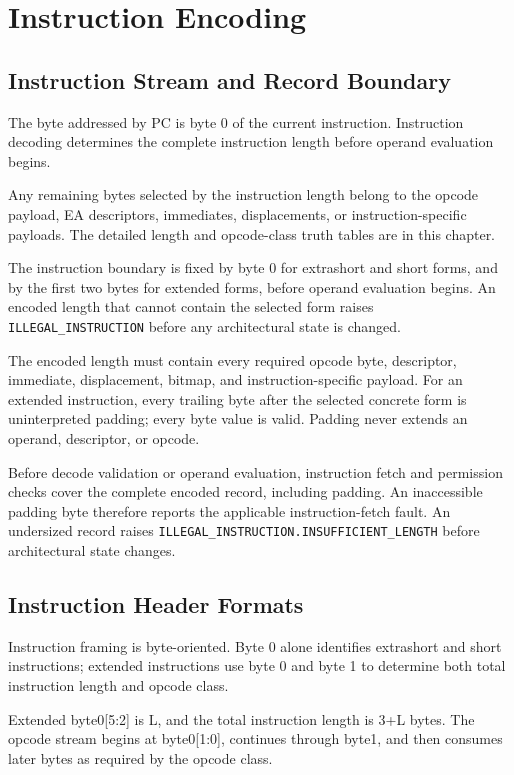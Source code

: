 \clearpage
\section{Instruction Encoding}\label{page:instruction-encoding}\label{section:instruction-header-formats}

\subsection{Instruction Stream and Record Boundary}
The byte addressed by PC is byte 0 of the current instruction. Instruction decoding determines the complete
instruction length before operand evaluation begins.

Any remaining bytes selected by the instruction length belong to the opcode payload, EA descriptors, immediates,
displacements, or instruction-specific payloads. The detailed length and opcode-class truth tables are in this
chapter.

The instruction boundary is fixed by byte 0 for extrashort and short forms, and by the first two bytes for
extended forms, before operand evaluation begins. An encoded length that cannot contain the selected form raises
\texttt{ILLEGAL\_INSTRUCTION} before any architectural state is changed.

The encoded length must contain every required opcode byte, descriptor, immediate, displacement, bitmap, and
instruction-specific payload. For an extended instruction, every trailing byte after the selected concrete form is
uninterpreted padding; every byte value is valid. Padding never extends an operand, descriptor, or opcode.

Before decode validation or operand evaluation, instruction fetch and permission checks cover the complete encoded
record, including padding. An inaccessible padding byte therefore reports the applicable instruction-fetch fault.
An undersized record raises \texttt{ILLEGAL\_INSTRUCTION.INSUFFICIENT\_LENGTH} before architectural state changes.

\subsection{Instruction Header Formats}

Instruction framing is byte-oriented. Byte 0 alone identifies extrashort and short instructions; extended
instructions use byte 0 and byte 1 to determine both total instruction length and opcode class.

Extended byte0[5:2] is L, and the total instruction length is 3+L bytes. The opcode stream begins at
byte0[1:0], continues through byte1, and then consumes later bytes as required by the opcode class.

